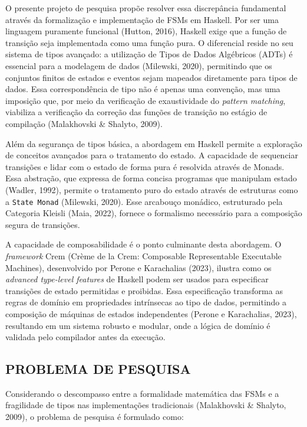 \documentclass[12pt,a4paper]{article}
\begin{document}
O presente projeto de pesquisa propõe resolver essa discrepância fundamental através da formalização e implementação de FSMs em Haskell. Por ser uma linguagem puramente funcional (Hutton, 2016), Haskell exige que a função de transição seja implementada como uma função pura. O diferencial reside no seu sistema de tipos avançado: a utilização de Tipos de Dados Algébricos (ADTs) é essencial para a modelagem de dados (Milewski, 2020), permitindo que os conjuntos finitos de estados e eventos sejam mapeados diretamente para tipos de dados. Essa correspondência de tipo não é apenas uma convenção, mas uma imposição que, por meio da verificação de exaustividade do \textit{pattern matching}, viabiliza a verificação da correção das funções de transição no estágio de compilação (Malakhovski \& Shalyto, 2009).

Além da segurança de tipos básica, a abordagem em Haskell permite a exploração de conceitos avançados para o tratamento do estado. A capacidade de sequenciar transições e lidar com o estado de forma pura é resolvida através de Monads. Essa abstração, que expressa de forma concisa programas que manipulam estado (Wadler, 1992), permite o tratamento puro do estado através de estruturas como a \texttt{State Monad} (Milewski, 2020). Esse arcabouço monádico, estruturado pela Categoria Kleisli (Maia, 2022), fornece o formalismo necessário para a composição segura de transições.

A capacidade de composabilidade é o ponto culminante desta abordagem. O \textit{framework} Crem (Crème de la Crem: Composable Representable Executable Machines), desenvolvido por Perone e Karachalias (2023), ilustra como os \textit{advanced type-level features} de Haskell podem ser usados para especificar transições de estado permitidas e proibidas. Essa especificação transforma as regras de domínio em propriedades intrínsecas ao tipo de dados, permitindo a composição de máquinas de estados independentes (Perone e Karachalias, 2023), resultando em um sistema robusto e modular, onde a lógica de domínio é validada pelo compilador antes da execução.

\subsection{PROBLEMA DE PESQUISA}

Considerando o descompasso entre a formalidade matemática das FSMs e a fragilidade de tipos nas implementações tradicionais (Malakhovski \& Shalyto, 2009), o problema de pesquisa é formulado como:
\end{document}
